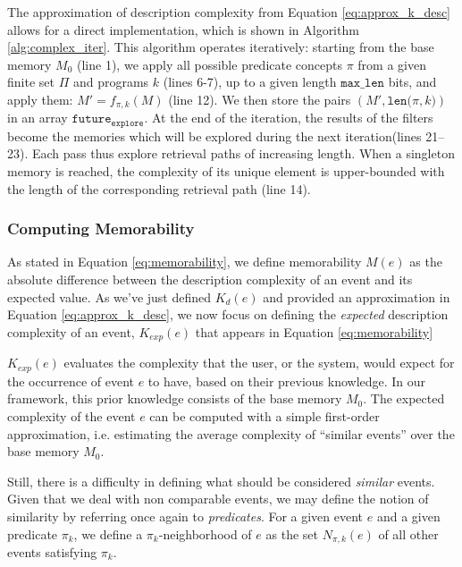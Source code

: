 \documentclass[entropy,article,submit,moreauthors,pdftex]{Definitions/mdpi}
\begin{document}
The approximation of description complexity from Equation \ref{eq:approx_k_desc} allows for
a direct implementation, which is shown in Algorithm \ref{alg:complex_iter}. This
algorithm operates iteratively: starting from the base memory $M_0$
(line 1), we apply all possible predicate concepts $\pi$ from a given finite set
$\Pi$ and programs $k$ (lines 6-7), up to a given length $\mathtt
    {max\_len}$ bits, and apply them: $M' = f_{\pi, k}(M)$ (line 12). We then store
the pairs $(M', \mathtt{len(}\pi, k\mathtt{)})$ in an array $\mathtt{future_
            {explore}}$. At the end of the iteration, the results of the filters become the
memories which will be explored during the next iteration(lines 21--23). Each
pass thus explore retrieval paths of increasing length. When a singleton memory
is reached, the complexity of its unique element is upper-bounded with the
length of the corresponding retrieval path (line 14).

\subsubsection{Computing Memorability}
As stated in Equation \ref{eq:memorability}, we define memorability $M(e)$ as the absolute difference between the description complexity of an event and its expected value. As we've just defined $K_d(e)$ and provided an approximation in Equation \ref{eq:approx_k_desc}, we now focus on defining the \emph{expected} description complexity of an event, $K_{exp}(e)$ that appears in Equation \ref{eq:memorability}

$K_{exp}(e)$ evaluates the complexity that the user, or the system, would expect for the occurrence of event $e$ to have, based on their previous knowledge. In our framework, this prior knowledge consists of the base memory $M_0$. The expected complexity of the event $e$ can be computed with a simple first-order approximation, i.e. estimating the average complexity of ``similar events'' over the base memory $M_0$.

Still, there is a difficulty in defining what
should be considered \emph{similar} events. Given that we deal with non comparable events, we may define the notion of similarity by referring once again to \emph{predicates}. For a given event $e$ and a given predicate $\pi_k$, we define a $\pi_k$-neighborhood of $e$ as the set $N_{\pi, k}(e)$ of all other events satisfying $\pi_k$.
\end{document}
